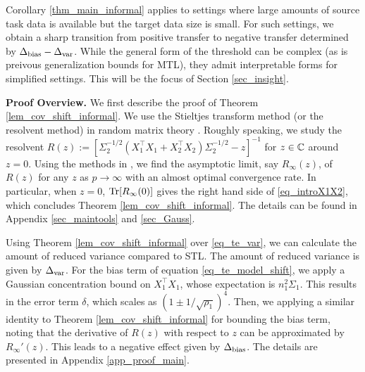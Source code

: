 Corollary \ref{thm_main_informal} applies to settings where large amounts of source task data is available but the target data size is small.
For such settings, we obtain a sharp transition from positive transfer to negative transfer determined by $\Delta_{\text{bias}} - \Delta_{\text{var}}$.
While the general form of the threshold can be complex (as is preivous generalization bounds for MTL), they admit interpretable forms for simplified settings.
This will be the focus of Section \ref{sec_insight}.


\textbf{Proof Overview.} We first describe the proof of Theorem \ref{lem_cov_shift_informal}.
We use the Stieltjes transform method (or the resolvent method) in random matrix theory \cite{bai2009spectral,tao2012topics,erdos2017dynamical}. Roughly speaking, we study the resolvent $R(z):=[\Sigma_2^{-1/2}( X_1^{\top}X_1 + X_2^{\top}X_2)\Sigma_2^{-1/2}-z]^{-1}$ for $z\in \mathbb{C}$ around $z=0$.
Using the methods in \cite{Anisotropic,yang2019spiked}, we find the asymptotic limit, say $R_\infty(z)$, of $R(z)$ for any $z$ as $p\to \infty$ with an almost optimal convergence rate. In particular, when $z=0$, $\operatorname{Tr}[R_\infty(0)]$ gives the right hand side of \eqref{eq_introX1X2}, which concludes Theorem \ref{lem_cov_shift_informal}. The details can be found in Appendix \ref{sec_maintools} and \ref{sec_Gauss}.

Using Theorem \ref{lem_cov_shift_informal} over \eqref{eq_te_var}, we can calculate the amount of reduced variance compared to STL.
The amount of reduced variance is given by $\Delta_{\text{var}}$.
For the bias term of equation \eqref{eq_te_model_shift}, we apply a Gaussian concentration bound on $X_1^{\top}X_1$, whose expectation is $n_1^2\Sigma_1$.
This results in the error term $\delta$, which scales as $(1 \pm 1/\sqrt{\rho_1})^4$.
Then, we applying a similar identity to Theorem \ref{lem_cov_shift_informal} for bounding the bias term, noting that the derivative of $R(z)$ with respect to $z$ can be approximated by $R_\infty'(z)$.
This leads to a negative effect given by $\Delta_{\text{bias}}$. %
The details are presented in Appendix \ref{app_proof_main}.

